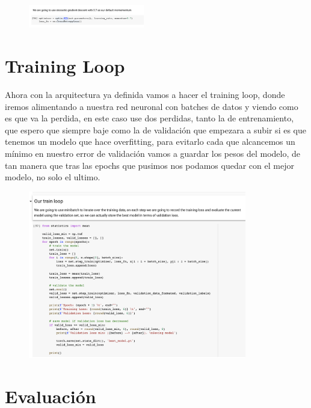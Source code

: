 \documentclass[12pt, fleqn]{report}                             %
\theoremstyle{break}                                            %
\begin{document}
        \begin{figure}[h!]
            \includegraphics[width=0.45\textwidth]{8}
        \end{figure}

        \clearpage

        \section{Training Loop}

        Ahora con la arquitectura ya definida vamos a hacer el training loop, donde iremos alimentando a nuestra red neuronal con
        batches de datos y viendo como es que va la perdida, en este caso use dos perdidas, tanto la de entrenamiento, que espero
        que siempre baje como la de validación que empezara a subir si es que tenemos un modelo que hace overfitting, para evitarlo
        cada que alcancemos un mínimo en nuestro error de validación vamos a guardar los pesos del modelo, de tan manera que tras
        las epochs que pusimos nos podamos quedar con el mejor modelo, no solo el ultimo.

        \begin{figure}[h!]
            \includegraphics[width=0.85\textwidth]{9}
        \end{figure}

        \clearpage

        \section{Evaluación}
\end{document}
